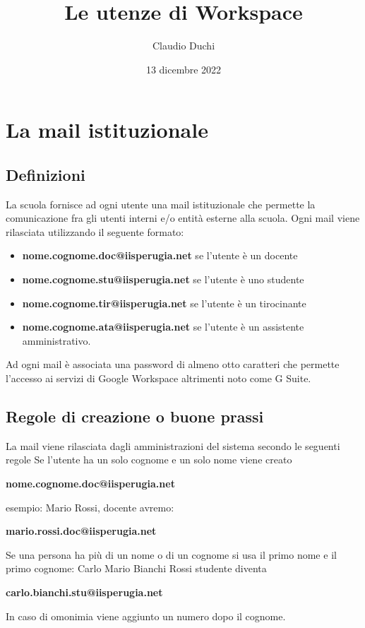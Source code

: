 \documentclass[structure=book,  
pagelayout=standard,defaultfont=cochineal,partialtoc]{suftesi}
\title{Le utenze di Workspace}
\author{Claudio Duchi}
\date{13 dicembre 2022}
\newcommand{\printmail}[1]{\textbf{#1}}
\begin{document}
\maketitle
\tableofcontents
\chapter{La mail istituzionale}
\printpartialtoc
\section{Definizioni}
La scuola fornisce ad ogni utente una mail istituzionale che permette 
la comunicazione fra gli utenti interni e/o entità esterne alla scuola.
Ogni mail viene rilasciata utilizzando il seguente formato:
\begin{itemize}
	\item \printmail{nome.cognome.doc@iisperugia.net} se l'utente è un docente
	\item \printmail{nome.cognome.stu@iisperugia.net} se l'utente è uno studente
	\item \printmail{nome.cognome.tir@iisperugia.net} se l'utente è un 
	tirocinante
	\item \printmail{nome.cognome.ata@iisperugia.net} se l'utente è un 
	assistente 
	amministrativo.
\end{itemize}
 
Ad ogni mail è associata una password di almeno otto caratteri che permette 
l'accesso ai servizi di Google Workspace altrimenti noto come G Suite.

\section{Regole di creazione o buone prassi} 
La mail viene rilasciata dagli amministrazioni del sistema secondo le seguenti 
regole
Se l'utente ha un solo cognome e un solo nome viene creato
\begin{center}
\printmail{nome.cognome.doc@iisperugia.net}
\end{center}
esempio: Mario Rossi, docente avremo:
\begin{center}
	\printmail{mario.rossi.doc@iisperugia.net}
\end{center}
Se una persona ha più di un nome o di un cognome si usa il primo nome e il  
primo cognome: Carlo Mario Bianchi Rossi studente diventa
\begin{center}
	\printmail{carlo.bianchi.stu@iisperugia.net}
\end{center}
In caso di omonimia viene aggiunto un numero dopo il cognome.
\end{document}
